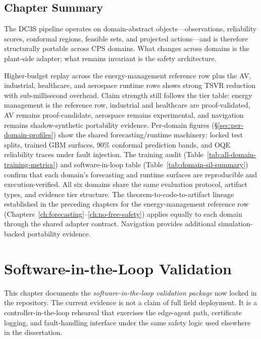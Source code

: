 \subsection{Chapter Summary}

The DC3S pipeline operates on domain-abstract objects---observations,
reliability scores, conformal regions, feasible sets, and projected
actions---and is therefore structurally portable across CPS domains.
What changes across domains is the plant-side adapter; what remains
invariant is the safety architecture.

Higher-budget replay across the energy-management reference row plus the AV,
industrial, healthcare, and aerospace runtime rows shows strong TSVR
reduction with sub-millisecond overhead.  Claim strength still follows the
tier table: energy management is the reference row, industrial and healthcare are
proof-validated, AV remains proof-candidate, aerospace remains
experimental, and navigation remains shadow-synthetic portability
evidence.  Per-domain figures (\S\ref{sec:per-domain-profiles}) show the
shared forecasting/runtime machinery: locked test splits, trained GBM
surfaces, 90\% conformal prediction bands, and OQE reliability traces
under fault injection.  The training audit
(Table~\ref{tab:all-domain-training-metrics}) and software-in-loop table
(Table~\ref{tab:domain-sil-summary}) confirm that each domain's
forecasting and runtime surfaces are reproducible and execution-verified.
All six domains share the same evaluation protocol, artifact types, and
evidence tier structure.  The theorem-to-code-to-artifact lineage
established in the preceding chapters for the energy-management reference row
(Chapters~\ref{ch:forecasting}--\ref{ch:no-free-safety}) applies equally
to each domain through the shared adapter contract.  Navigation provides
additional simulation-backed portability evidence.


\section{Software-in-the-Loop Validation}
\label{ch:hil}

This chapter documents the \emph{software-in-the-loop validation package} now
locked in the repository.  The current evidence is not a claim of full
field deployment.  It is a controller-in-the-loop rehearsal that exercises
the edge-agent path, certificate logging, and fault-handling interface under
the same safety logic used elsewhere in the dissertation.


